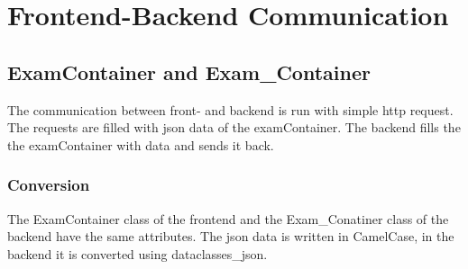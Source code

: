 \author{Paul Hoffmann}
\graphicspath{ {./src/chapters/developer/media/} }

\chapter{Frontend-Backend Communication}

\section{ExamContainer and Exam\_Container}
The communication between front- and backend is run with
simple http request. The requests are filled with json data
of the examContainer. The backend fills the the
examContainer with data and sends it back.

\subsection{Conversion}
The ExamContainer class of the frontend and the
Exam\_Conatiner class of the backend have the same
attributes. The json data is written in CamelCase, in the
backend it is converted using dataclasses\_json.
